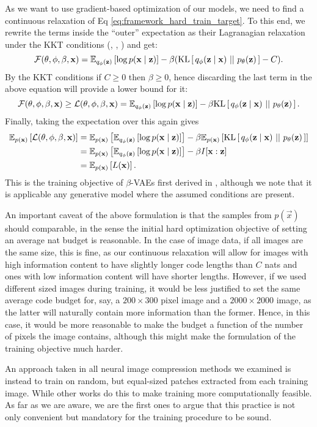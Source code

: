 As we want to use gradient-based optimization of our models, we need to find a
continuous relaxation of Eq \ref{eq:framework_hard_train_target}.
To this end, we rewrite the terms inside the ``outer'' expectation as their
Lagranagian relaxation under the KKT conditions (\cite{karush2014minima},
\cite{kuhn2014nonlinear}, \cite{higgins2017beta}) and get:
\[
  \F(\theta, \phi, \beta, \vec{x}) = 
  \Exp{\log p(\vec{x} \mid \vec{z})}{q_\phi(\vec{z})}
  - \beta (\KL{q_{\phi}(\vec{z} \mid \vec{x})}{p_{\theta}(\vec{z})} - C).
\]
By the KKT conditions if $C \geq 0$ then $\beta \geq 0$, hence discarding the last
term in the above equation will provide a lower bound for it:
\[
  \F(\theta, \phi, \beta, \vec{x}) \geq
  \L(\theta, \phi, \beta, \vec{x}) =
  \Exp{\log p(\vec{x} \mid \vec{z})}{q_\phi(\vec{z})} - \beta
  \KL{q_{\phi}(\vec{z} \mid \vec{x})}{p_{\theta}(\vec{z})}.
\]
Finally, taking the expectation over this again gives
\begin{equation}
\label{eq:framework_train_target}
\begin{aligned}
  \Exp{\L(\theta, \phi, \beta, \vec{x})}{p(\vec{x})} &=
  \Exp{\Exp{\log p(\vec{x} \mid \vec{z})}{q_\phi(\vec{z})}}{p(\vec{x})} - \beta
  \Exp{\KL{q_{\phi}(\vec{z} \mid \vec{x})}{p_{\theta}(\vec{z})}}{p(\vec{x})} \\
  &= \Exp{\Exp{\log p(\vec{x} \mid \vec{z})}{q_\phi(\vec{z})}}{p(\vec{x})} - \beta
  I[ \vec{x} : \vec{z} ] \\
  &= \Exp{L(\vec{x})}{p(\vec{x})}.
\end{aligned}
\end{equation}
This is the training objective of $\beta$-VAEs first derived in
\cite{higgins2017beta}, although we note that it is applicable any generative
model where the assumed conditions are present.
\par
An important caveat of the above formulation is that the samples from
$p(\vec{x})$ should comparable, in the sense the initial hard optimization objective
of setting an average nat budget is reasonable. In the case of image data, if
all images are the same size, this is fine, as our continuous relaxation will
allow for images with high information content to have slightly longer code
lengths than $C$ nats and ones with low information content will have shorter
lengths. However, if we used different sized images during training, it would be
less justified to set the same average code budget for, say, a $200 \times 300$ pixel
image and a $2000 \times 2000$ image, as the latter will naturally contain more
information than the former. Hence, in this case, it would be more reasonable
to make the budget a function of the number of pixels the image contains,
although this might make the formulation of the training objective much harder.
\par
An approach taken in all neural image compression methods we examined is instead
to train on random, but equal-sized patches extracted from each training image.
While other works do this to make training more computationally feasible. As
far as we are aware, we are the first ones to argue that this practice is not only
convenient but mandatory for the training procedure to be sound.

